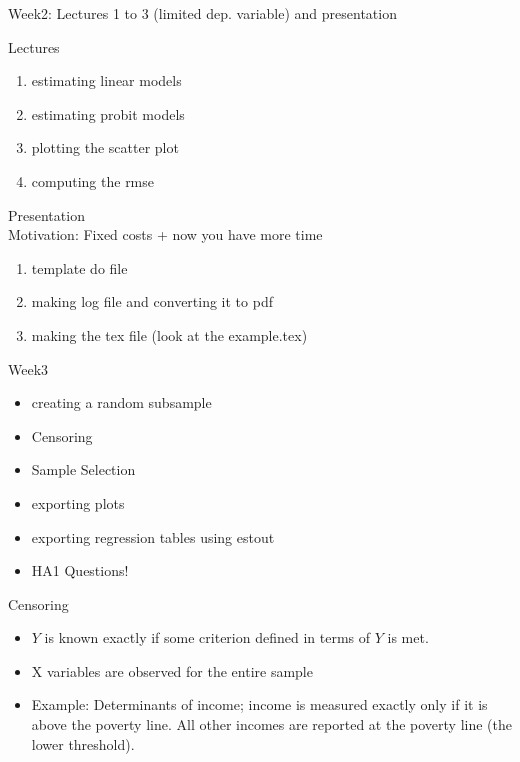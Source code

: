 \documentclass{beamer}
\begin{document}
\begin{frame}{Week2: Lectures 1 to 3 (limited dep. variable) and presentation}

Lectures
\begin{enumerate}[1.]
\item estimating linear models
\item estimating probit models
\item plotting the scatter plot
\item computing the rmse
\end{enumerate}

Presentation
\\
Motivation: Fixed costs + now you have more time
\\
\begin{enumerate}[1.]
\item template do file
\item making log file and converting it to pdf
\item making the tex file (look at the example.tex)
\end{enumerate}

\end{frame}
\begin{frame}{Week3}
\begin{itemize}
\item creating a random subsample 
\item Censoring 
\item Sample Selection
\item exporting plots
\item exporting regression tables using estout
\item HA1 Questions!
\end{itemize}
\end{frame}

\begin{frame}{Censoring}
\begin{itemize}
\item $Y$ is known exactly if some criterion defined in terms of $Y$ is met.
\item X variables are observed for the entire sample
\item Example: Determinants of income; income is measured exactly only if it 
is above the poverty line. All other incomes are reported at the poverty line 
(the lower threshold).
\end{itemize}
\end{frame}
\end{document}
